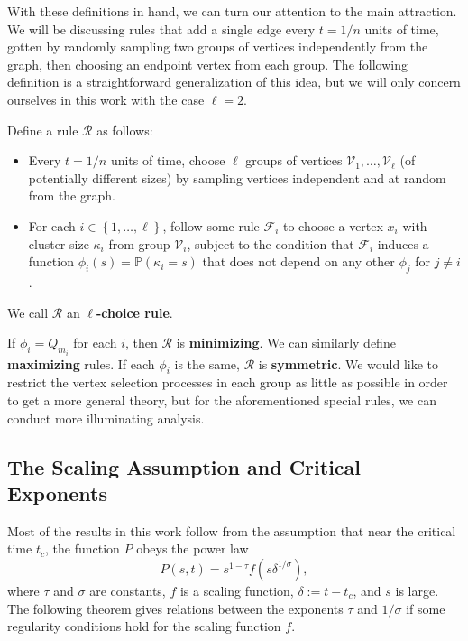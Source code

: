 \documentclass[twoside,10pt]{article}
\begin{document}
With these definitions in hand, we can turn our attention to the main attraction. We will be discussing rules that add a single edge every $t=1/n$ units of time, gotten by randomly sampling two groups of vertices independently from the graph, then choosing an endpoint vertex from each group. The following definition is a straightforward generalization of this idea, but we will only concern ourselves in this work with the case $\ell=2$.

\pagebreak

\begin{defn}[]
        Define a rule $\mathcal{R}$ as follows:
        \begin{itemize}
                \item Every $t=1/n$ units of time, choose $\ell$ groups of vertices $\mathcal{V}_1, \dots, \mathcal{V}_{\ell}$ (of potentially different sizes) by sampling vertices independent and at random from the graph.
                \item For each $i \in \left\{ 1, \dots, \ell \right\}$, follow some rule $\mathcal{F}_{i}$ to choose a vertex $x_i$ with cluster size $\kappa_i$ from group $\mathcal{V}_i$, subject to the condition that $\mathcal{F}_i$ induces a function $\phi_i(s) = \mathbb{P}\left( \kappa_i=s \right) $ that does not depend on any other $\phi_j$ for $j \neq i$.
        \end{itemize}
We call $\mathcal{R}$ an \textbf{$\ell$-choice rule}.
\end{defn}

If $\phi_{i}=Q_{m_i}$ for each $i$, then $\mathcal{R}$ is \textbf{minimizing}. We can similarly define \textbf{maximizing} rules. If each $\phi_i$ is the same, $\mathcal{R}$ is \textbf{symmetric}. We would like to restrict the vertex selection processes in each group as little as possible in order to get a more general theory, but for the aforementioned special rules, we can conduct more illuminating analysis.

\subsection{The Scaling Assumption and Critical Exponents}

Most of the results in this work follow from the assumption that near the critical time $t_c$, the function $P$ obeys the power law
\begin{equation}
	\label{scaling-assumption}
        P(s, t) = s^{1-\tau}f(s \delta^{1/\sigma}),
\end{equation}
where $\tau$ and $\sigma$ are constants, $f$ is a scaling function, $\delta:= t-t_{c}$, and $s$ is large. The following theorem gives relations between the exponents $\tau$ and $1/\sigma$ if some regularity conditions hold for the scaling function $f$.
\end{document}

